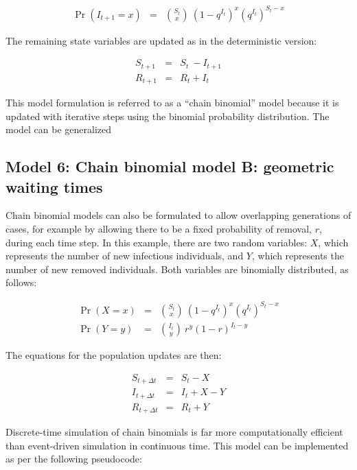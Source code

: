\documentclass[margin,line,11pt]{article}
\begin{document}
\begin{eqnarray*}
\Pr (I_{t+1}=x) &=& \binom{S_t}{x}\ (1-q^{I_t})^x (q^{I_t})^{S_t-x}
\end{eqnarray*}

\noindent The remaining state variables are updated as in the deterministic version:

\begin{eqnarray*}
S_{t+1} &=& S_t\ - I_{t+1} \\
R_{t+1} &=& R_t + I_t
\end{eqnarray*}

\noindent This model formulation is referred to as a ``chain binomial'' model because it is updated with iterative steps using the binomial probability distribution. The model can be generalized 

\subsection{Model 6: Chain binomial model B: geometric waiting times}

Chain binomial models can also be formulated to allow overlapping generations of cases, for example by allowing there to be a fixed probability of removal, $r$, during each time step. In this example, there are two random variables: $X$, which represents the number of new infectious individuals, and $Y$, which represents the number of new removed individuals. Both variables are binomially distributed, as follows:

\begin{eqnarray*}
\Pr (X=x) &=& \binom{S_t}{x}\ (1-q^{I_t})^x (q^{I_t})^{S_t-x}\\
\Pr (Y=y) &=& \binom{I_t}{y}\ r^y (1-r)^{I_t-y}
\end{eqnarray*}


\noindent The equations for the population updates are then:

\begin{eqnarray*}
S_{t+\Delta t} &=& S_t - X \\
I_{t+\Delta t} &=& I_t + X - Y \\
R_{t+\Delta t} &=& R_t + Y
\end{eqnarray*}

\noindent Discrete-time simulation of chain binomials is far more computationally efficient than event-driven simulation in continuous time. This model can be implemented as per the following pseudocode:\\
\end{document}

